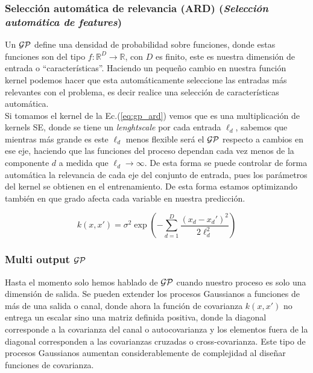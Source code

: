 \subsubsection{Selección automática de relevancia (ARD) (\textit{Selección automática de features})}
Un $\mathcal{GP}$ define una densidad de probabilidad sobre funciones, donde estas funciones son del tipo $f: \mathbb{R}^D \rightarrow \mathbb{R}$, con $D$ es finito, este es nuestra dimensión de entrada o ``características''. Haciendo un pequeño cambio en nuestra función kernel podemos hacer que esta automáticamente seleccione las entradas más relevantes con el problema, es decir realice una selección de características automática.\\

Si tomamos el kernel de la Ec.(\ref{eq:gp_ard}) vemos que es una multiplicación de kernels SE, donde se tiene un \textit{lenghtscale} por cada entrada $\ell_d$, sabemos que mientras más grande es este $\ell_d$ menos flexible será el $\mathcal{GP}$ respecto a cambios en ese eje, haciendo que las funciones del proceso dependan cada vez menos de la componente $d$ a medida que $\ell_d \rightarrow \infty$. De esta forma se puede controlar de forma automática la relevancia de cada eje del conjunto de entrada, pues los parámetros del kernel se obtienen en el entrenamiento. De esta forma estamos optimizando también en que grado afecta cada variable en nuestra predicción.

\begin{equation}\label{eq:gp_ard}
	k(x, x') = \sigma^2 \exp\left( -\sum_{d=1}^{D} \frac{(x_d - x_d')^2}{2\ell_d^2}\right)
\end{equation}


\subsubsection{Multi output \texorpdfstring{$\mathcal{GP}$}{GP}}
Hasta el momento solo hemos hablado de $\mathcal{GP}$ cuando nuestro proceso es solo una dimensión de salida. Se pueden extender los procesos Gaussianos a funciones de más de una salida o canal, donde ahora la función de covarianza $k(x, x')$ no entrega un escalar sino una matriz definida positiva, donde la diagonal corresponde a la covarianza del canal o autocovarianza y los elementos fuera de la diagonal corresponden a las covarianzas cruzadas o cross-covarianza. Este tipo de procesos Gaussianos aumentan considerablemente de complejidad al diseñar funciones de covarianza.\\ 

